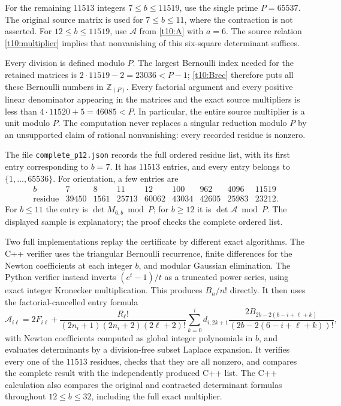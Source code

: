 For the remaining $11513$ integers $7\le b\le11519$, use the
single prime $P=65537$. The original source matrix is used for
$7\le b\le11$, where the contraction is not asserted. For
$12\le b\le11519$, use $\mathcal A$ from \eqref{t10:A} with $a=6$.
The source relation \eqref{t10:multiplier} implies that nonvanishing
of this six-square determinant suffices.

Every division is defined modulo $P$. The largest Bernoulli index
needed for the retained matrices is $2\cdot11519-2=23036<P-1$;
\eqref{t10:Brec} therefore puts all these Bernoulli numbers in
$\mathbb Z_{(P)}$. Every factorial argument and every positive
linear denominator appearing in the matrices and the exact source
multipliers is less than $4\cdot11520+5=46085<P$. In particular,
the entire source multiplier is a unit modulo $P$. The computation
never replaces a singular reduction modulo $P$ by an unsupported
claim of rational nonvanishing: every recorded residue is nonzero.

The file \texttt{complete\_p12.json} records the full ordered residue
list, with its first entry corresponding to $b=7$. It has $11513$
entries, and every entry belongs to $\{1,\ldots,65536\}$. For orientation,
a few entries are
\begin{equation}\label{t12:sample}
\begin{array}{c|rrrrrrrr}
 b&7&8&11&12&100&962&4096&11519\\\hline
\text{residue}&39450&1561&25713&60062&43034&42605&25983&23212.
\end{array}
\end{equation}
For $b\le11$ the entry is $\det M_{6,b}\bmod P$;
for $b\ge12$ it is $\det\mathcal A\bmod P$.
The displayed sample is explanatory; the proof checks the complete
ordered list.

Two full implementations replay the certificate by different exact
algorithms. The C++ verifier uses the triangular Bernoulli recurrence,
finite differences for the Newton coefficients at each integer $b$,
and modular Gaussian elimination. The Python verifier instead
inverts $(e^t-1)/t$ as a truncated power series, using exact integer
Kronecker multiplication. This produces $B_n/n!$ directly. It then
uses the factorial-cancelled entry formula
\begin{equation}\label{t12:cancelled-entry}
 \mathcal A_{i\ell}=2F_{i\ell}
 +\frac{R_\ell!}{(2n_i+1)(2n_i+2)(2\ell+2)!}
 \sum_{k=0}^i d_{i,2k+1}
 \frac{2B_{2b-2(6-i+\ell+k)}}{(2b-2(6-i+\ell+k))!},
\end{equation}
with Newton coefficients computed as global integer polynomials
in $b$, and evaluates determinants by a division-free subset
Laplace expansion. It verifies every one of the $11513$ residues,
checks that they are all nonzero, and compares the complete result
with the independently produced C++ list. The C++ calculation also
compares the original and contracted determinant formulas throughout
$12\le b\le32$, including the full exact multiplier.

